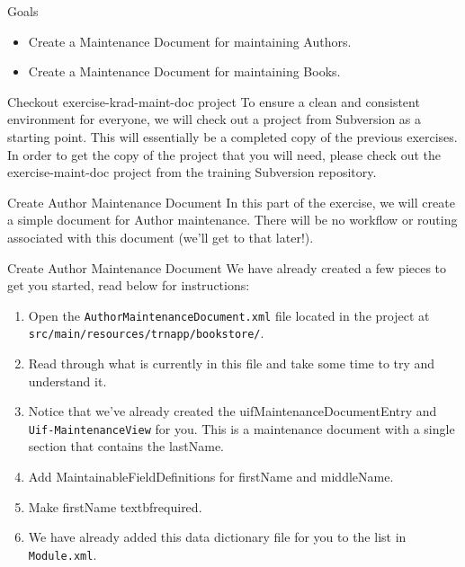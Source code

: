 \documentclass[xcolor=dvipsnames,14pt,professionalfonts]{beamer}
\begin{document}
\begin{frame}{Goals}
  \begin{itemize}
    \item Create a Maintenance Document for maintaining Authors.
    \item Create a Maintenance Document for maintaining Books.
  \end{itemize}
\end{frame}
\begin{frame}{Checkout exercise-krad-maint-doc project}
  To ensure a clean and consistent environment for everyone, we will check out a project from Subversion as a starting point.  This will essentially be a completed copy of the previous exercises.
In order to get the copy of the project that you will need, please
check out the exercise-maint-doc project from the training Subversion
repository.
\end{frame}
\begin{frame}{Create Author Maintenance Document}
  In this part of the exercise, we will create a simple document
    for Author maintenance.  There will be no workflow or routing
    associated with this document (we’ll get to that later!).
\end{frame}

\begin{frame}{Create Author Maintenance Document}
  We have already created a few pieces to get you started, read below for instructions:
  \begin{enumerate}
  \item Open the \texttt{AuthorMaintenanceDocument.xml} file located in the project at \texttt{src/main/resources/trnapp/bookstore/}.
  \item Read through what is currently in this file and take some time to try and understand it.
  \item Notice that we’ve already created the
    uifMaintenanceDocumentEntry and \texttt{Uif-MaintenanceView} for you.  This is a maintenance document with a single section that contains the lastName.
  \item Add MaintainableFieldDefinitions for firstName and middleName.
  \item Make firstName 
textbf{required}.
  \item We have already added this data dictionary file for you to the list in \texttt{Module.xml}.
  \end{enumerate}
\end{frame}
\end{document}
